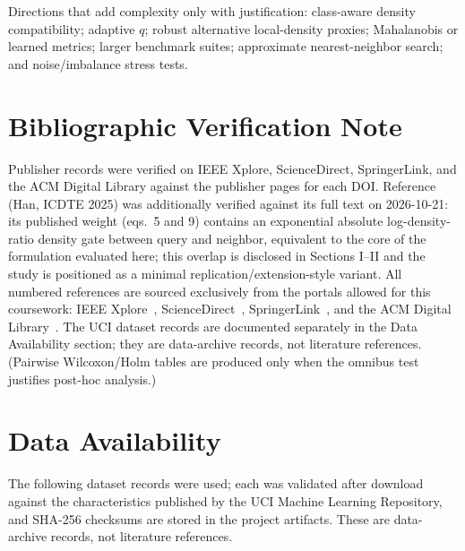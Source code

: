 \documentclass[conference]{IEEEtran}
\begin{document}
Directions that add complexity only with justification: class-aware density compatibility; adaptive $q$; robust alternative local-density proxies; Mahalanobis or learned metrics; larger benchmark suites; approximate nearest-neighbor search; and noise/imbalance stress tests.

\section*{Bibliographic Verification Note}

Publisher records were verified on IEEE Xplore, ScienceDirect, SpringerLink, and the ACM Digital Library against the publisher pages for each DOI. Reference~\cite{dynamicdwknn2025} (Han, ICDTE 2025) was additionally verified against its full text on 2026-10-21: its published weight (eqs.\ 5 and 9) contains an exponential absolute log-density-ratio density gate between query and neighbor, equivalent to the core of the formulation evaluated here; this overlap is disclosed in Sections I--II and the study is positioned as a minimal replication/extension-style variant. All numbered references are sourced exclusively from the portals allowed for this coursework: IEEE Xplore~\cite{coverhart1967,dudani1976,keller1985,macleod1987}, ScienceDirect~\cite{pan2020,ding2024,abdalla2025,garcia2010}, SpringerLink~\cite{yuan2021,amer2025effective,amer2025fuzzy,eisinga2017}, and the ACM Digital Library~\cite{dynamicdwknn2025}. The UCI dataset records are documented separately in the Data Availability section; they are data-archive records, not literature references. (Pairwise Wilcoxon/Holm tables are produced only when the omnibus test justifies post-hoc analysis.)

\section*{Data Availability}

The following dataset records were used; each was validated after download against the characteristics published by the UCI Machine Learning Repository, and SHA-256 checksums are stored in the project artifacts. These are data-archive records, not literature references.
\end{document}
